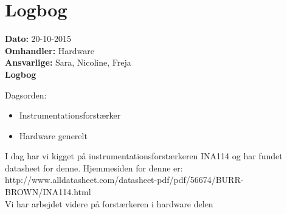 \section{Logbog}

\textbf{Dato:} 20-10-2015 \\
\textbf{Omhandler:} Hardware \\
\textbf{Ansvarlige:} Sara, Nicoline, Freja \\
\textbf{Logbog}

Dagsorden:
\begin{itemize}
	\item Instrumentationsforstærker
	\item Hardware generelt
\end{itemize}

I dag har vi kigget på instrumentationsforstærkeren INA114 og har fundet datasheet for denne. Hjemmesiden for denne er: http://www.alldatasheet.com/datasheet-pdf/pdf/56674/BURR-BROWN/INA114.html\\
Vi har arbejdet videre på forstærkeren i hardware delen\\
